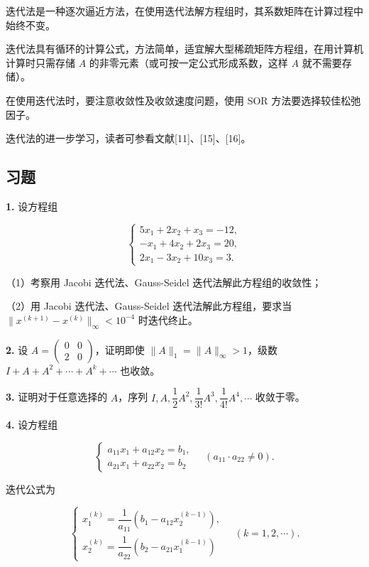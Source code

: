 \documentclass[
  10pt,
  fontset=fandol]{ctexart}
\begin{document}
迭代法是一种逐次逼近方法，在使用迭代法解方程组时，其系数矩阵在计算过程中始终不变。

迭代法具有循环的计算公式，方法简单，适宜解大型稀疏矩阵方程组，在用计算机计算时只需存储 \(A\) 的非零元素（或可按一定公式形成系数，这样 \(A\) 就不需要存储）。

在使用迭代法时，要注意收敛性及收敛速度问题，使用 SOR 方法要选择较佳松弛因子。

迭代法的进一步学习，读者可参看文献{[}11{]}、{[}15{]}、{[}16{]}。

\subsection{习题}\label{ux4e60ux9898}

\textbf{1.} 设方程组

\[
\begin{cases}
5x_1+2x_2+x_3=-12,\\
-x_1+4x_2+2x_3=20,\\
2x_1-3x_2+10x_3=3.
\end{cases}
\]

（1）考察用 Jacobi 迭代法、Gauss-Seidel 迭代法解此方程组的收敛性；

（2）用 Jacobi 迭代法、Gauss-Seidel 迭代法解此方程组，要求当 \(\|x^{(k+1)}-x^{(k)}\|_\infty<10^{-4}\) 时迭代终止。

\textbf{2.} 设 \(A=\begin{pmatrix}0&0\\2&0\end{pmatrix}\)，证明即使 \(\|A\|_1=\|A\|_\infty>1\)，级数 \(I+A+A^2+\cdots+A^k+\cdots\) 也收敛。

\textbf{3.} 证明对于任意选择的 \(A\)，序列 \(I,\allowbreak A,\allowbreak \dfrac12A^2,\allowbreak \dfrac1{3!}A^3,\allowbreak \dfrac1{4!}A^4,\allowbreak \cdots\) 收敛于零。

\textbf{4.} 设方程组

\[
\begin{cases}
a_{11}x_1+a_{12}x_2=b_1,\\
a_{21}x_1+a_{22}x_2=b_2
\end{cases}
\quad(a_{11}\cdot a_{22}\neq0).
\]

迭代公式为

\[
\begin{cases}
x_1^{(k)}=\dfrac1{a_{11}}(b_1-a_{12}x_2^{(k-1)}),\\[5pt]
x_2^{(k)}=\dfrac1{a_{22}}(b_2-a_{21}x_1^{(k-1)})
\end{cases}
\quad(k=1,2,\cdots).
\]
\end{document}
